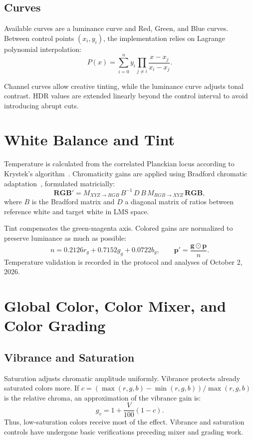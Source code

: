\subsection{Curves}

Available curves are a luminance curve and Red, Green, and Blue curves. Between control points $(x_i,y_i)$, the implementation relies on Lagrange polynomial interpolation:
\begin{equation}
  P(x)=\sum_{i=0}^{n} y_i\prod_{j\ne i}\frac{x-x_j}{x_i-x_j}.
\end{equation}

Channel curves allow creative tinting, while the luminance curve adjusts tonal contrast. HDR values are extended linearly beyond the control interval to avoid introducing abrupt cuts.

\section{White Balance and Tint}

Temperature is calculated from the correlated Planckian locus according to Krystek's algorithm~\cite{krystek1985}. Chromaticity gains are applied using Bradford chromatic adaptation~\cite{lam1985}, formulated matricially:
\begin{equation}
 \mathbf{RGB}' = M_{XYZ\rightarrow RGB}\,B^{-1}\,D\,B\,M_{RGB\rightarrow XYZ}\,\mathbf{RGB},
\end{equation}
where $B$ is the Bradford matrix and $D$ a diagonal matrix of ratios between reference white and target white in LMS space.

Tint compensates the green-magenta axis. Colored gains are normalized to preserve luminance as much as possible:
\begin{equation}
  n=0.2126r_g+0.7152g_g+0.0722b_g, \qquad \mathbf{p}'=\frac{\mathbf{g}\odot\mathbf{p}}{n}.
\end{equation}
Temperature validation is recorded in the protocol and analyses of October 2, 2026.

\section{Global Color, Color Mixer, and Color Grading}

\subsection{Vibrance and Saturation}

Saturation adjusts chromatic amplitude uniformly. Vibrance protects already saturated colors more. If $c=(\max(r,g,b)-\min(r,g,b))/\max(r,g,b)$ is the relative chroma, an approximation of the vibrance gain is:
\begin{equation}
  g_v = 1+\frac{V}{100}(1-c).
\end{equation}
Thus, low-saturation colors receive most of the effect. Vibrance and saturation controls have undergone basic verifications preceding mixer and grading work.

